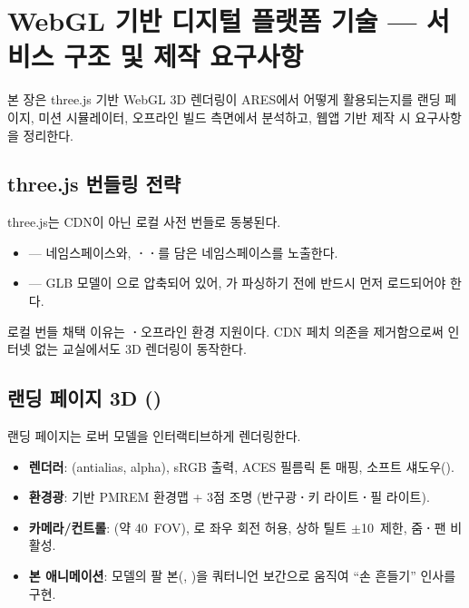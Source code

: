 \section{WebGL 기반 디지털 플랫폼 기술 --- 서비스 구조 및 제작 요구사항}

본 장은 three.js 기반 WebGL 3D 렌더링이 ARES에서 어떻게 활용되는지를
랜딩 페이지, 미션 시뮬레이터, 오프라인 빌드 측면에서 분석하고, 웹앱 기반
제작 시 요구사항을 정리한다.

\subsection{three.js 번들링 전략}

three.js는 CDN이 아닌 로컬 사전 번들로 동봉된다.

\begin{itemize}
  \item {} ---  네임스페이스와,
        \textbf{·}\textbf{·}를
        담은  네임스페이스를 노출한다.
  \item {} --- GLB 모델이
        으로 압축되어 있어, 가
        파싱하기 전에 반드시 먼저 로드되어야 한다.
\end{itemize}

로컬 번들 채택 이유는 \textbf{·}오프라인 환경 지원이다. CDN
페치 의존을 제거함으로써 인터넷 없는 교실에서도 3D 렌더링이 동작한다.

\subsection{랜딩 페이지 3D ()}

랜딩 페이지는 로버 모델을 인터랙티브하게 렌더링한다.

\begin{itemize}
  \item \textbf{렌더러}: (antialias, alpha), sRGB 출력,
        ACES 필름릭 톤 매핑, 소프트 섀도우().
  \item \textbf{환경광}:  기반 PMREM 환경맵 + 3점 조명
        (반구광\textbf{·}키 라이트\textbf{·}필 라이트).
  \item \textbf{카메라/컨트롤}: (약 40\textdegree\ FOV),
        로 좌우 회전 허용, 상하 틸트 $\pm$10\textdegree\ 제한,
        줌\textbf{·}팬 비활성.
  \item \textbf{본 애니메이션}: 모델의 팔 본(,
        )을 쿼터니언 보간으로 움직여 ``손 흔들기'' 인사를 구현.
\end{itemize}

